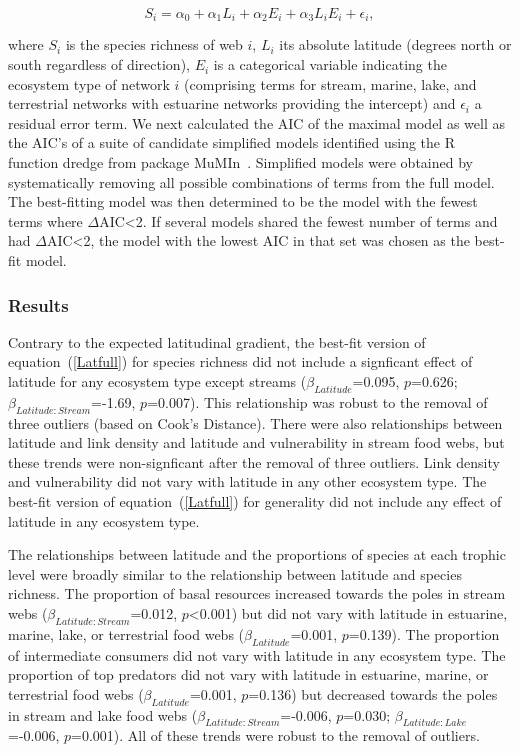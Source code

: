 \documentclass[12pt]{article}
\begin{document}
    \begin{equation}
    \label{Latfull}
    S_{i} = \alpha_{0} + \alpha_{1} L_{i} + \alpha_{2} E_{i} + \alpha_{3} L_{i} E_{i} + \epsilon_{i} ,
    \end{equation}

    \noindent where $S_{i}$ is the species richness of web $i$, $L_{i}$ its absolute
    latitude (degrees north or south  regardless of direction), $E_{i}$ is a categorical
    variable indicating the ecosystem type of network $i$ (comprising terms for stream, 
    marine, lake, and terrestrial networks with estuarine
    networks providing the intercept) and $\epsilon_{i}$ a residual error term. 
    We next calculated the AIC
    of the maximal model as well as the AIC's of a suite of candidate simplified models identified
    using the R~\citep{R} function dredge from package MuMIn~\citep{MuMIn}. 
    Simplified models were obtained by
    systematically removing all possible combinations of terms from the full model.
    The best-fitting model was then determined to be the model with the fewest terms 
    where $\Delta$AIC\textless2. If several models shared the fewest number of terms 
    and had $\Delta$AIC\textless2, the model with the lowest AIC in that set was chosen as the best-fit
    model.


  \subsubsection*{Results}
    Contrary to the expected latitudinal gradient, the best-fit version of
    equation~(\ref{Latfull}) for species richness did not include a signficant effect of latitude for any ecosystem type except streams
    ($\beta_{Latitude}$=0.095, $p$=0.626; $\beta_{Latitude:Stream}$=-1.69, $p$=0.007).  This
    relationship was robust to the removal of three outliers (based on Cook's Distance). 
    There were also relationships between latitude and link density and latitude and vulnerability
    in stream food webs, but these trends were non-signficant after the removal of three outliers.
    Link density and vulnerability did not vary with latitude in any other ecosystem type.
    The best-fit version of equation~(\ref{Latfull}) for generality did not include any effect of
    latitude in any ecosystem type. 


    The relationships between latitude and the proportions of species at each trophic level were broadly similar
    to the relationship between latitude and species richness. 
    The proportion of basal resources increased towards the poles in stream webs ($\beta_{Latitude:Stream}$=0.012, $p$\textless0.001) 
    but did not vary with latitude in estuarine, marine, lake, or terrestrial 
    food webs ($\beta_{Latitude}$=0.001, $p$=0.139).
    The proportion of intermediate consumers did not vary with latitude in any ecosystem type.
    The proportion of top predators did not vary with latitude in 
    estuarine, marine, or terrestrial food webs ($\beta_{Latitude}$=0.001, $p$=0.136) but decreased towards the poles in stream and lake food 
    webs ($\beta_{Latitude:Stream}$=-0.006, $p$=0.030; 
    $\beta_{Latitude:Lake}$=-0.006, $p$=0.001). 
    All of these trends were robust to the removal of outliers.
\end{document}
